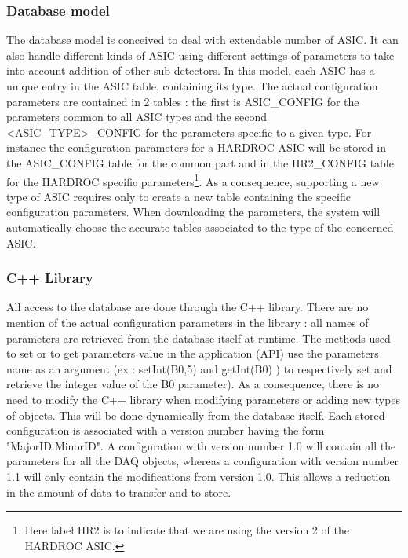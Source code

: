 \documentclass[english]{article}
\begin{document}
\subsubsection{Database model}

The database model is conceived to deal with  extendable number of ASIC. It can also handle different kinds of ASIC using different  settings of parameters to take into account addition of other sub-detectors. 
 In this model, each ASIC has a unique entry in the ASIC table, containing its type. The actual configuration parameters
are contained in 2 tables : the first is  ASIC\_CONFIG for the parameters common
to all ASIC types and the second   <ASIC\_TYPE>\_CONFIG for the parameters specific
to a given type. For instance the configuration parameters for a HARDROC
ASIC will be stored in the ASIC\_CONFIG table for the common part
and in the HR2\_CONFIG table for the HARDROC specific parameters\footnote{Here label HR2 is to indicate that we are using the version 2 of the HARDROC ASIC.}.  As a
consequence, supporting a new type of ASIC requires only to create
a new table containing the specific configuration parameters. When
downloading the parameters, the system will automatically choose the
accurate tables associated to the type of the concerned ASIC. 



\subsubsection{C++ Library}

All access to the database are done through the C++ library. There
are no mention of the actual configuration parameters in the library
: all names of parameters are retrieved from the database itself at
runtime. The methods used to set or to get parameters value in the
application (API) use the parameters name as an argument (ex : setInt(\textquotedbl{}B0\textquotedbl{},5)
and getInt(\textquotedbl{}B0\textquotedbl{}) ) to respectively set and
retrieve the integer value of the B0 parameter). As a consequence,
there is no need to modify the C++ library when modifying parameters
or adding new types of objects. This will be done dynamically from the
database itself. Each stored configuration is associated with a version
number having the form "MajorID.MinorID". A configuration with version
number 1.0 will contain all the parameters for all the DAQ objects,
whereas a configuration with version number 1.1 will only contain
the modifications from version 1.0. This allows a reduction in the
amount of data to transfer and to store.
\end{document}
